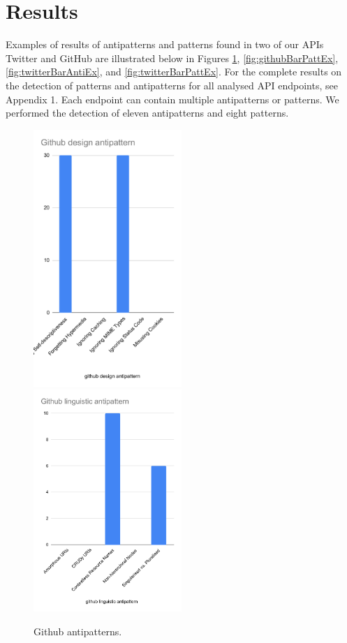 \section{Results}

Examples of results of antipatterns and patterns found in two of our APIs Twitter and GitHub are illustrated below in Figures \ref{fig:githubBarAntiEx}, \ref{fig:githubBarPattEx}, \ref{fig:twitterBarAntiEx}, and \ref{fig:twitterBarPattEx}. For the complete results on the detection of patterns and antipatterns for all analysed API endpoints, see Appendix 1. Each endpoint can contain multiple antipatterns or patterns. We performed the detection of eleven antipatterns and eight patterns.

\begin{figure}[htb!]
\includegraphics[width=0.5\textwidth]{img/exampleBars/githubAntiDes.pdf}
\includegraphics[width=0.5\textwidth]{img/exampleBars/githubAntiLing.pdf}
\caption{Github antipatterns.}
\label{fig:githubBarAntiEx}
\end{figure}

